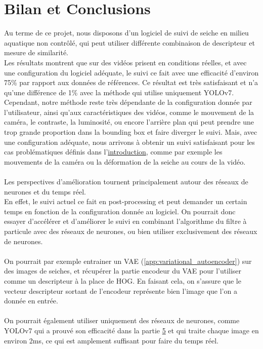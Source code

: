 \chapter{Bilan et Conclusions}
Au terme de ce projet, nous disposons d'un logiciel de suivi de seiche en milieu aquatique non contrôlé, qui peut utiliser différente combinaison de descripteur et mesure de similarité.\\
Les résultats montrent que sur des vidéos prisent en conditions réelles, et avec une configuration du logiciel adéquate, le suivi ce fait avec une efficacité d'environ 75\% par rapport aux données de références. Ce résultat est très satisfaisant et n'a qu'une différence de 1\% avec la méthode qui utilise uniquement YOLOv7.\\
Cependant, notre méthode reste très dépendante de la configuration donnée par l'utilisateur, ainsi qu'aux caractéristiques des vidéos, comme le mouvement de la caméra, le contraste, la luminosité, ou encore l'arrière plan qui peut prendre une trop grande proportion dans la bounding box et faire diverger le suivi. Mais, avec une configuration adéquate, nous arrivons à obtenir un suivi satisfaisant pour les cas problématiques définis dans l'\hyperlink{chapter.1}{introduction}, comme par exemple les mouvements de la caméra ou la déformation de la seiche au cours de la vidéo.\\
\\
Les perspectives d'amélioration tournent principalement autour des réseaux de neurones et du temps réel.\\
En effet, le suivi actuel ce fait en post-processing et peut demander un certain temps en fonction de la configuration donnée au logiciel. On pourrait donc essayer d'accélérer et d'améliorer le suivi en combinant l'algorithme du filtre à particule avec des réseaux de neurones, ou bien utiliser exclusivement des réseaux de neurones.\\
\\
On pourrait par exemple entrainer un VAE (\ref{app:variational_autoencoder}) sur des images de seiches, et récupérer la partie encodeur du VAE pour l'utiliser comme un descripteur à la place de HOG. En faisant cela, on s'assure que le vecteur descripteur sortant de l'encodeur représente bien l'image que l'on a donnée en entrée.\\
\\
On pourrait également utiliser uniquement des réseaux de neurones, comme YOLOv7 qui a prouvé son efficacité dans la partie \hyperlink{chapter.5}{5} et qui traite chaque image en environ 2ms, ce qui est amplement suffisant pour faire du temps réel.

\clearpage